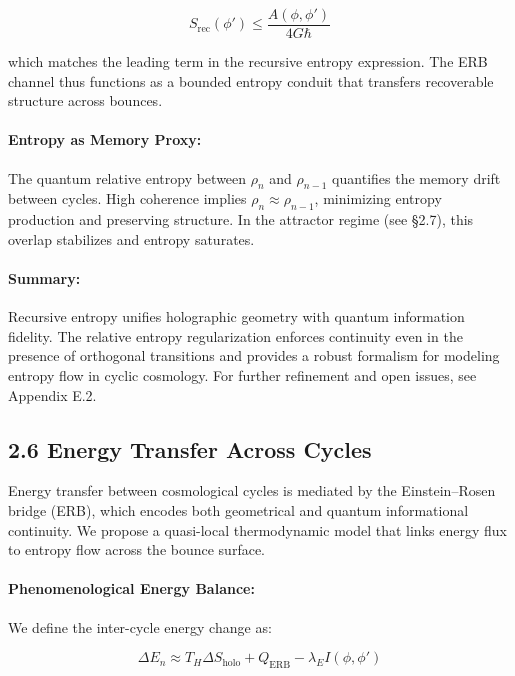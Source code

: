 \[
S_{\text{rec}}(\phi') \leq \frac{A(\phi, \phi')}{4G\hbar}
\]

which matches the leading term in the recursive entropy expression. The ERB channel thus functions as a bounded entropy conduit that transfers recoverable structure across bounces.

\paragraph{Entropy as Memory Proxy:}

The quantum relative entropy between \( \rho_n \) and \( \rho_{n-1} \) quantifies the memory drift between cycles. High coherence implies \( \rho_n \approx \rho_{n-1} \), minimizing entropy production and preserving structure. In the attractor regime (see §2.7), this overlap stabilizes and entropy saturates.

\paragraph{Summary:}

Recursive entropy unifies holographic geometry with quantum information fidelity. The relative entropy regularization enforces continuity even in the presence of orthogonal transitions and provides a robust formalism for modeling entropy flow in cyclic cosmology. For further refinement and open issues, see Appendix E.2.

\subsection*{2.6 Energy Transfer Across Cycles}

Energy transfer between cosmological cycles is mediated by the Einstein–Rosen bridge (ERB), which encodes both geometrical and quantum informational continuity. We propose a quasi-local thermodynamic model that links energy flux to entropy flow across the bounce surface.

\paragraph{Phenomenological Energy Balance:}

We define the inter-cycle energy change as:

\begin{equation}
\Delta E_n \approx T_H \Delta S_{\text{holo}} + Q_{\text{ERB}} - \lambda_E I(\phi, \phi')
\end{equation}

